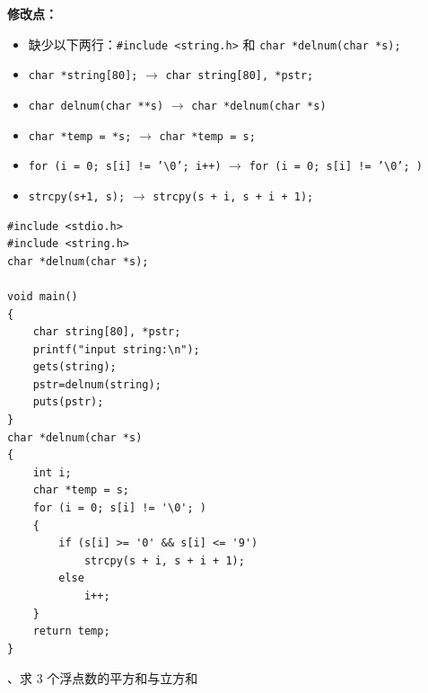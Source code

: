 \documentclass[UTF8,a4paper,10.5pt]{ctexart}
\begin{document}
\noindent\textbf{修改点：}
\begin{itemize}[leftmargin=2em, itemsep=1pt, topsep=2pt]
    \item 缺少以下两行：\texttt{\#include <string.h>} 和 \texttt{char *delnum(char *s);}
    \item \texttt{char *string[80];} $\longrightarrow$ \texttt{char string[80], *pstr;}
    \item \texttt{char delnum(char **s)} $\longrightarrow$ \texttt{char *delnum(char *s)}
    \item \texttt{char *temp = *s;} $\longrightarrow$ \texttt{char *temp = s;}
    \item \texttt{for (i = 0; s[i] != '\textbackslash 0'; i++)} $\longrightarrow$ \texttt{for (i = 0; s[i] != '\textbackslash 0'; )}
    \item \texttt{strcpy(s+1, s);} $\longrightarrow$ \texttt{strcpy(s + i, s + i + 1);}
\end{itemize}
\begin{lstlisting}
#include <stdio.h>
#include <string.h>
char *delnum(char *s);

void main()
{
    char string[80], *pstr;
    printf("input string:\n");
    gets(string);
    pstr=delnum(string);
    puts(pstr);
}
char *delnum(char *s)
{
    int i;
    char *temp = s;
    for (i = 0; s[i] != '\0'; )
    {
        if (s[i] >= '0' && s[i] <= '9')
            strcpy(s + i, s + i + 1);
        else
            i++;
    }
    return temp;
}
\end{lstlisting}

\medskip
{}、求 3 个浮点数的平方和与立方和
\end{document}
